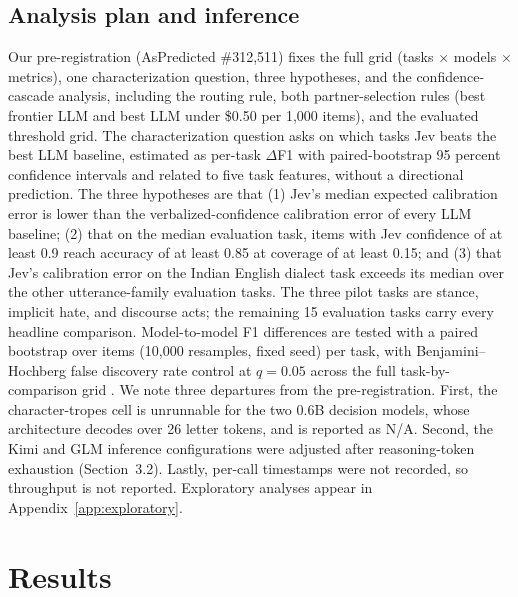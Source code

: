 \documentclass[11pt]{article}
\begin{document}
\subsection{Analysis plan and inference}
Our pre-registration (AsPredicted \#312{,}511) fixes the full grid (tasks $\times$ models $\times$ metrics), one characterization question, three hypotheses, and the confidence-cascade analysis, including the routing rule, both partner-selection rules (best frontier LLM and best LLM under \$0.50 per 1{,}000 items), and the evaluated threshold grid. The characterization question asks on which tasks Jev beats the best LLM baseline, estimated as per-task $\Delta$F1 with paired-bootstrap 95 percent confidence intervals and related to five task features, without a directional prediction. The three hypotheses are that (1) Jev's median expected calibration error is lower than the verbalized-confidence calibration error of every LLM baseline; (2) that on the median evaluation task, items with Jev confidence of at least 0.9 reach accuracy of at least 0.85 at coverage of at least 0.15; and (3) that Jev's calibration error on the Indian English dialect task exceeds its median over the other utterance-family evaluation tasks. The three pilot tasks are stance, implicit hate, and discourse acts; the remaining 15 evaluation tasks carry every headline comparison. Model-to-model F1 differences are tested with a paired bootstrap over items (10{,}000 resamples, fixed seed) per task, with Benjamini--Hochberg false discovery rate control at $q = 0.05$ across the full task-by-comparison grid \citep{benjamini1995controlling}. We note three departures from the pre-registration. First, the character-tropes cell is unrunnable for the two 0.6B decision models, whose architecture decodes over 26 letter tokens, and is reported as N/A. Second, the Kimi and GLM inference configurations were adjusted after reasoning-token exhaustion (Section~3.2). Lastly, per-call timestamps were not recorded, so throughput is not reported. Exploratory analyses appear in Appendix~\ref{app:exploratory}.

\section{Results}

\begin{table}[t]
\centering
\caption{Macro-F1 ($\times$100) on the 18 CSS classification tasks. The Rand (random baseline), FT (fine-tuned RoBERTa-large), and GPT-4 columns reproduce the published 2023 values of \citet{ziems2024llms}; the remaining columns are our 2026 zero-shot runs on identical test items. Bold marks the best 2026 model per task; $^{d}$ marks the three pilot tasks, which are excluded from the headline comparisons; -- marks the character-tropes cells unrunnable for the 0.6B decision models and the fine-tuned value Ziems et al.\ did not release. Paired-bootstrap confidence intervals and BH-FDR-adjusted $p$-values for every model-to-model comparison appear in Appendix~\ref{app:registered}, Table~\ref{tab:full}.}
\label{tab:main}
\resizebox{\textwidth}{!}{}
\end{table}
\end{document}
